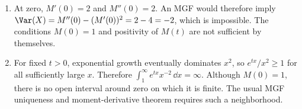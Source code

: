 \begin{enumerate}[label=\textbf{D\arabic*.},leftmargin=*,itemsep=1em]
\[\]
The original mean and variance are both $1$, so $\E[W]=3-2=1$ and $\Var(W)=(-2)^2=4$. The domain reverses direction because the scale coefficient is negative.
\item At zero, $M'(0)=2$ and $M''(0)=2$. An MGF would therefore imply $\Var(X)=M''(0)-(M'(0))^2=2-4=-2$, which is impossible. The conditions $M(0)=1$ and positivity of $M(t)$ are not sufficient by themselves.
\item For fixed $t>0$, exponential growth eventually dominates $x^2$, so $e^{tx}/x^2\geq1$ for all sufficiently large $x$. Therefore $\int_1^\infty e^{tx}x^{-2}\,\dd x=\infty$. Although $M(0)=1$, there is no open interval around zero on which it is finite. The usual MGF uniqueness and moment-derivative theorem requires such a neighborhood.
\end{enumerate}

